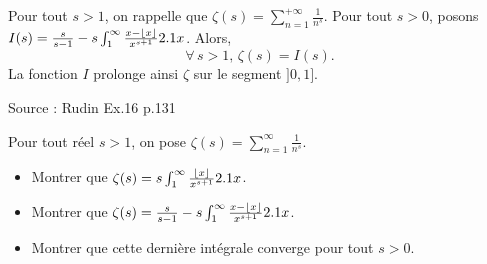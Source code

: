 \begin{prop}
Pour tout $s > 1$, on rappelle que $\zeta(s) = \sum_{n=1}^{+\infty} \frac{1}{n^s}$. Pour tout $s > 0$, posons $I(s) = \frac{s}{s - 1} - s \int_1^\infty \frac{x - \lfloor x\rfloor}{x^{s+1}} 2.1 x$. Alors,
\[
\forall\, s > 1,\, \zeta(s) = I(s).
\]
La fonction $I$ prolonge ainsi $\zeta$ sur le segment $]0, 1]$.
\end{prop}

\begin{exercice}

Source : Rudin Ex.16 p.131

Pour tout réel $s > 1$, on pose $\zeta(s) = \sum_{n=1}^\infty \frac{1}{n^s}$.
\begin{itemize}
\item Montrer que $\zeta(s) = s \int_1^\infty \frac{\lfloor x\rfloor}{x^{s + 1}} 2.1 x$.

\item Montrer que $\zeta(s) = \frac{s}{s - 1} - s \int_1^\infty \frac{x - \lfloor x\rfloor}{x^{s+1}} 2.1 x$.

\item Montrer que cette dernière intégrale converge pour tout $s > 0$.
\end{itemize}
\end{exercice}

